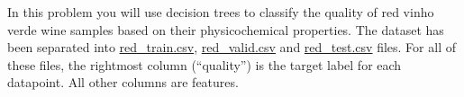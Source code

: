 \documentclass[12pt]{article}
\newenvironment{problem}[2][Problem:]{\begin{trivlist}
\item[\hskip \labelsep {\bfseries #1}\hskip \labelsep {\bfseries #2.}]}{\end{trivlist}}
\begin{document}
\begin{problem}{Decision Tree Classification [20 points]}
In this problem you will use decision trees  to classify the quality of red vinho verde wine samples based on their physicochemical properties. 
The dataset has been separated into \href{https://canvas.dartmouth.edu/files/3128324/download?download_frd=1}{red\_train.csv}, \href{https://canvas.dartmouth.edu/files/3128325/download?download_frd=1}{red\_valid.csv} and \href{https://canvas.dartmouth.edu/files/3128323/download?download_frd=1}{red\_test.csv} files. 
For all of these files, the rightmost column (``quality'') is the target label for each datapoint.
All other columns are features. 


\end{problem}
\end{document}
